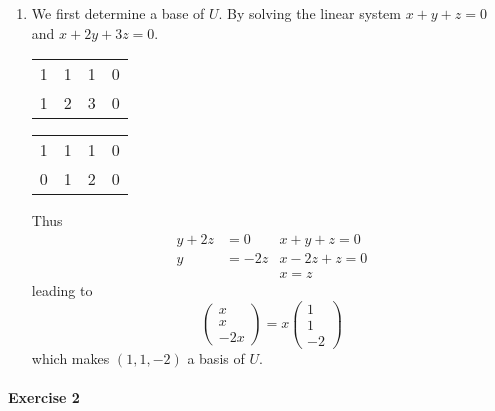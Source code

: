 \documentclass{article}
\begin{document}
\begin{enumerate}
    \item We first determine a base of $U$. By solving the linear system $x + y + z = 0$ and $x + 2y + 3z = 0$.
    \begin{center}
        \begin{tabular}{c c c | c}
            1 & 1 & 1 & 0 \\
            1 & 2 & 3 & 0
        \end{tabular}\quad
        \begin{tabular}{c c c | c}
            1 & 1 & 1 & 0 \\
            0 & 1 & 2 & 0
        \end{tabular}
    \end{center}
    Thus
    \begin{align*}
        y + 2z &= 0 & x + y + z = 0 \\
        y &= -2z    & x - 2z + z = 0 \\
        && x = z
    \end{align*}
    leading to
    \begin{equation*}
        \begin{pmatrix}
            x \\ x \\ -2x
        \end{pmatrix}
        =
        x
        \begin{pmatrix}
            1 \\ 1 \\ -2
        \end{pmatrix}
    \end{equation*}
    which makes $(1, 1, -2)$ a basis of $U$.

\end{enumerate}

\paragraph{Exercise 2}
\end{document}
